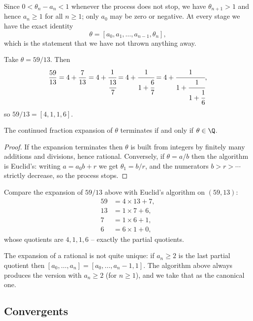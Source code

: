 Since $0 < \theta_n - a_n < 1$ whenever the process does not stop, we have $\theta_{n+1} > 1$ and hence $a_n \geq 1$ for all $n \geq 1$; only $a_0$ may be zero or negative. At every stage we have the exact identity
$$
\theta = [a_0, a_1, \dots, a_{n-1}, \theta_n],
$$
which is the statement that we have not thrown anything away.

\begin{example}
	Take $\theta = 59/13$. Then
	$$
	\frac{59}{13} = 4 + \frac7{13} = 4 + \cfrac1{\cfrac{13}7} = 4 + \cfrac1{1 + \cfrac67} = 4 + \cfrac1{1 + \cfrac1{1 + \cfrac16}},
	$$
	so $59/13 = [4, 1, 1, 6]$.
\end{example}

\begin{proposition}
	The continued fraction expansion of $\theta$ terminates if and only if $\theta \in \Q$.
\end{proposition}
\begin{proof}
	If the expansion terminates then $\theta$ is built from integers by finitely many additions and divisions, hence rational. Conversely, if $\theta = a/b$ then the algorithm is Euclid's: writing $a = a_0 b + r$ we get $\theta_1 = b/r$, and the numerators $b > r > \cdots$ strictly decrease, so the process stops.
\end{proof}

\begin{example}
	Compare the expansion of $59/13$ above with Euclid's algorithm on $(59, 13)$:
	\begin{align*}
		59 &= 4\times13 + 7, \\
		13 &= 1 \times 7 + 6, \\
		7 &= 1\times 6 + 1, \\
		6 &= 6\times 1 + 0,
	\end{align*}
	whose quotients are $4, 1, 1, 6$ -- exactly the partial quotients.
\end{example}

\begin{remark}
	The expansion of a rational is not quite unique: if $a_n \geq 2$ is the last partial quotient then $[a_0, \dots, a_n] = [a_0, \dots, a_n - 1, 1]$. The algorithm above always produces the version with $a_n \geq 2$ (for $n \geq 1$), and we take that as the canonical one.
\end{remark}

\subsection{Convergents}

